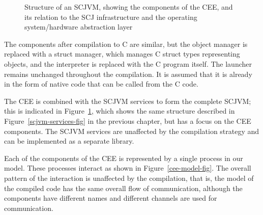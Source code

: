 \begin{figure}[bth]
  \caption{Structure of an SCJVM, showing the components of the CEE,
    and its relation to the SCJ infrastructure and the operating
    system/hardware abstraction layer}
  \label{cee-fig}
\end{figure}

The components after compilation to C are similar, but the object
manager is replaced with a struct manager, which manages C struct
types representing objects, and the interpreter is replaced with the C
program itself.
The launcher remains unchanged throughout the compilation.
It is assumed that it is already in the form of native code that can
be called from the C code.

The CEE is combined with the SCJVM services to form the complete
SCJVM; this is indicated in Figure~\ref{cee-fig}, which shows the same
structure described in Figure~\ref{scjvm-services-fig} in the previous
chapter, but has a focus on the CEE components.
The SCJVM services are unaffected by the compilation strategy and can
be implemented as a separate library.

Each of the components of the CEE is represented by a single \Circus{}
process in our model.
These processes interact as shown in Figure~\ref{cee-model-fig}.
The overall pattern of the interaction is unaffected by the
compilation, that is, the model of the compiled code has the same
overall flow of communication, although the components have different
names and different channels are used for communication.

